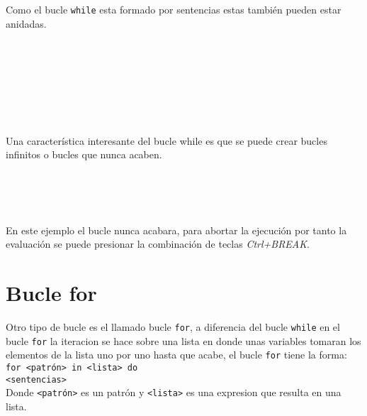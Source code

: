      Como el bucle \texttt{while} esta formado por sentencias estas también pueden estar anidadas.
      
      \begin{fxcode}
         \\
         \\
         \\
         \\
         \\
         \\
      \end{fxcode}
      
      Una característica interesante del bucle while es que se puede crear bucles infinitos o bucles que nunca acaben.
      
      \begin{fxcode}
         \\
         \\
         \\
      \end{fxcode}
      
      En este ejemplo el bucle nunca acabara, para abortar la ejecución por tanto la evaluación se puede presionar la combinación de teclas {\it Ctrl+BREAK}.
      
   \section{Bucle for}
      Otro tipo de bucle es el llamado bucle \texttt{for}, a diferencia del bucle \texttt{while} en el bucle \texttt{for} la iteracion se hace sobre una lista en donde unas variables tomaran los elementos de la lista uno por uno hasta que acabe, el bucle \texttt{for} tiene la forma:
      \\
      
      \texttt{for~<patrón>~in~<lista>~do}\\
      \texttt{\linetab<sentencias>}
      \\
      
      Donde \texttt{<patrón>} es un patrón y \texttt{<lista>} es una expresion que resulta en una lista.
      \\
      
